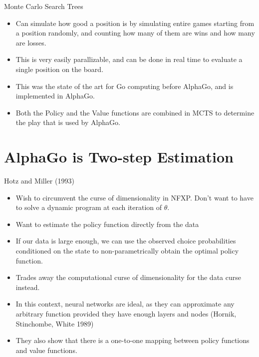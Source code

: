 \documentclass[presentation]{beamer}
\begin{document}
\begin{frame}[label={sec:org074a1b2}]{Monte Carlo Search Trees}
\begin{itemize}
\item Can simulate how good a position is by simulating entire games
starting from a position randomly, and counting how many of them are
wins and how many are losses.
\item This is very easily parallizable, and can be done in real time to
evaluate a single position on the board.
\item This was the state of the art for Go computing before AlphaGo, and
is implemented in AlphaGo.
\item Both the Policy and the Value functions are combined in MCTS to
determine the play that is used by AlphaGo.
\end{itemize}
\end{frame}

\section{AlphaGo is Two-step Estimation}
\label{sec:orgd84a01a}


\begin{frame}[label={sec:org9dedff4}]{Hotz and Miller (1993)}
\begin{itemize}
\item Wish to circumvent the curse of dimensionality in NFXP. Don't want
to have to solve a dynamic program at each iteration of \(\theta\).
\item Want to estimate the policy function directly from the data
\item If our data is large enough, we can use the observed choice
probabilities conditioned on the state to non-parametrically obtain
the optimal policy function.
\item Trades away the computational curse of dimensionality for the data
curse instead.
\item In this context, neural networks are ideal, as they can approximate
any arbitrary function provided they have enough layers and nodes
(Hornik, Stinchombe, White 1989)
\item They also show that there is a one-to-one mapping between policy
functions and value functions.
\end{itemize}
\end{frame}
\end{document}
